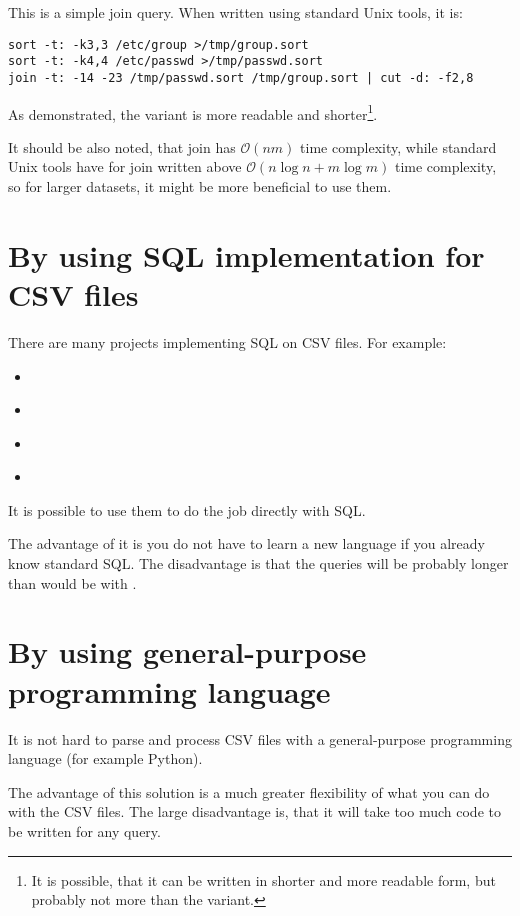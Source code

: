 This is a simple join query. When written using standard Unix tools, it is:
\begin{verbatim}
sort -t: -k3,3 /etc/group >/tmp/group.sort
sort -t: -k4,4 /etc/passwd >/tmp/passwd.sort
join -t: -14 -23 /tmp/passwd.sort /tmp/group.sort | cut -d: -f2,8 
\end{verbatim}

As demonstrated, the  variant is 
more readable and shorter\footnote{It is possible, that it can be written in shorter and more readable form, but probably not more than the  variant.}.

It should be also noted, that  join has $\mathcal{O}(nm)$ time complexity, while standard Unix tools have for join written above
$\mathcal{O}(n\log n + m\log m)$ time complexity, so for larger datasets, it might be more beneficial to use them.

\section{By using SQL implementation for CSV files}
There are many projects implementing SQL on CSV files. For example:
\begin{itemize}
    \item {} \cite{q}
    \item {} \cite{csv-sql} 
    \item {} \cite{trdsql}
    \item {} \cite{csvq}
\end{itemize}

It is possible to use them to do the job directly with SQL. 

The advantage of it is you do not have to learn a new language if you already know standard SQL. 
The disadvantage is that the queries will be probably longer than would be with .

\section{By using general-purpose programming language}
It is not hard to parse and process CSV files with a general-purpose programming language (for example Python).

The advantage of this solution is a much greater flexibility of what you can do with the CSV files.
The large disadvantage is, that it will take too much code to be written for any query.

